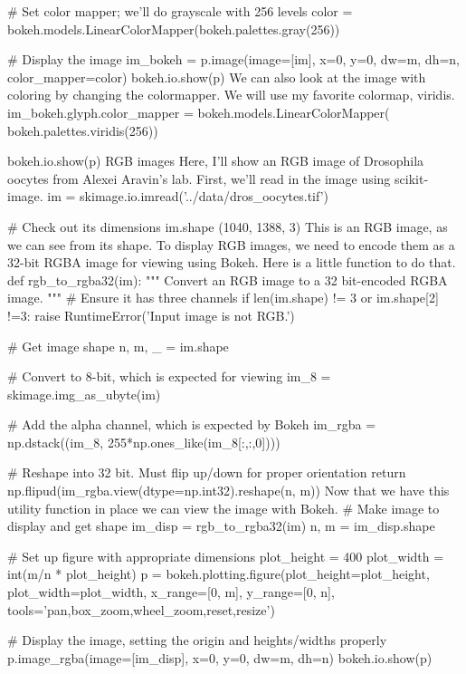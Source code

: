 # Set color mapper; we'll do grayscale with 256 levels
color = bokeh.models.LinearColorMapper(bokeh.palettes.gray(256))

# Display the image
im_bokeh = p.image(image=[im], x=0, y=0, dw=m, dh=n, color_mapper=color)
bokeh.io.show(p)
We can also look at the image with coloring by changing the colormapper. We will use my favorite colormap, viridis.
im_bokeh.glyph.color_mapper = bokeh.models.LinearColorMapper(
                                            bokeh.palettes.viridis(256))

bokeh.io.show(p)
RGB images
Here, I'll show an RGB image of Drosophila oocytes from Alexei Aravin's lab. First, we'll read in the image using scikit-image.
im = skimage.io.imread('../data/dros_oocytes.tif')

# Check out its dimensions
im.shape
(1040, 1388, 3)
This is an RGB image, as we can see from its shape. To display RGB images, we need to encode them as a 32-bit RGBA image for viewing using Bokeh. Here is a little function to do that.
def rgb_to_rgba32(im):
    """
    Convert an RGB image to a 32 bit-encoded RGBA image.
    """
    # Ensure it has three channels
    if len(im.shape) != 3 or im.shape[2] !=3:
        raise RuntimeError('Input image is not RGB.')
    
    # Get image shape
    n, m, _ = im.shape

    # Convert to 8-bit, which is expected for viewing
    im_8 = skimage.img_as_ubyte(im)

    # Add the alpha channel, which is expected by Bokeh
    im_rgba = np.dstack((im_8, 255*np.ones_like(im_8[:,:,0])))
    
    # Reshape into 32 bit. Must flip up/down for proper orientation
    return np.flipud(im_rgba.view(dtype=np.int32).reshape(n, m))
Now that we have this utility function in place we can view the image with Bokeh.
# Make image to display and get shape
im_disp = rgb_to_rgba32(im)
n, m = im_disp.shape

# Set up figure with appropriate dimensions
plot_height = 400
plot_width = int(m/n * plot_height)
p = bokeh.plotting.figure(plot_height=plot_height, plot_width=plot_width, 
                          x_range=[0, m], y_range=[0, n],
                          tools='pan,box_zoom,wheel_zoom,reset,resize')

# Display the image, setting the origin and heights/widths properly
p.image_rgba(image=[im_disp], x=0, y=0, dw=m, dh=n)
bokeh.io.show(p)
